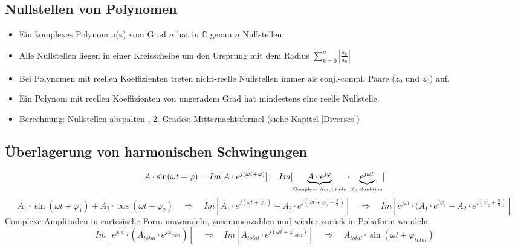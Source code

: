 	\subsection{Nullstellen von Polynomen}
		\begin{itemize}
		  	\item Ein komplexes Polynom p(z) vom Grad $n$ hat in $ \mathbb{C}$ genau $n$ Nullstellen.
		  	\item Alle Nullstellen liegen in einer Kreisscheibe um den Ursprung mit dem Radius $ \sum\limits_{k=0}^{n} \left| \frac{a_k}{a_n} \right|$
		  	\item Bei Polynomen mit reellen Koeffizienten treten nicht-reelle Nullstellen immer als conj.-compl. Paare ($z_0$ und $\overline{z_0}$) auf.
		  	\item Ein Polynom mit reellen Koeffizienten von ungeradem Grad hat mindestens eine reelle Nullstelle.
		  	\item Berechnung: Nullstellen abspalten , 2. Grades: Mitternachtsformel (siehe Kapitel \ref{Diverses}) 
		\end{itemize}

	\subsection{Überlagerung von harmonischen Schwingungen}
		$$A \cdot \sin(\omega t + \varphi) = Im[A \cdot e^{j(\omega t + \varphi)}] =
		Im[\underbrace{A \cdot e^{j\varphi}}_{\text{\tiny{Complexe Amplitude}}}
		\cdot \underbrace{e^{j\omega t}}_{\text{\tiny{Zeitfunktion}}}]$$
		$$ A_1 \cdot \sin(\omega t + \varphi_1) + A_2 \cdot \cos(\omega t + \varphi_2) 
		 \quad \Rightarrow \quad 
		 Im[A_1 \cdot e^{j(\omega t + \varphi_1)} + A_2 \cdot e^{j (\omega t + \varphi_2
		 + \frac{\pi}{2})}] \quad \Rightarrow \quad 
		 Im[e^{j \omega t} \cdot  (A_1 \cdot e^{j \varphi_1} + A_2 \cdot e^{j (\varphi_2
		 + \frac{\pi}{2})}]$$ 
		Complexe Amplituden in cartesische Form umwandeln, zusammenzählen und wieder
		zurück in Polarform wandeln.
		$$ Im[e^{j \omega t} \cdot  (A_{total} \cdot e^{j \varphi_{total}})] 
		 \quad \Rightarrow \quad 
		 Im[A_{total} \cdot e^{j (\omega t + \varphi_{total})}] 
		 \quad \Rightarrow \quad 
		 A_{total} \cdot \sin(\omega t + \varphi_{total})$$
		
